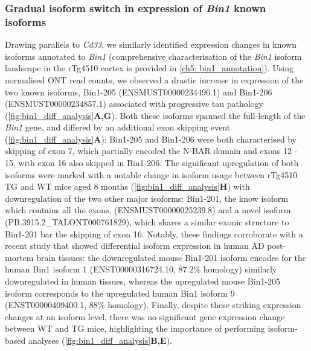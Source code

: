 \subsubsection{Gradual isoform switch in expression of \textit{Bin1} known isoforms}
Drawing parallels to \textit{Cd33}, we similarly identified expression changes in known isoforms annotated to \textit{Bin1} (comprehensive characterisation of the \textit{Bin1} isoform landscape in the rTg4510 cortex is provided in \cref{ch5: bin1_annotation}). Using normalised ONT read counts, we observed a drastic increase in expression of the two known isoforms, Bin1-205 (ENSMUST00000234496.1) and Bin1-206 (ENSMUST00000234857.1) associated with progressive tau pathology (\cref{fig:bin1_diff_analysis}\textbf{A,G}). Both these isoforms spanned the full-length of the \textit{Bin1} gene, and differed by an additional exon skipping event (\cref{fig:bin1_diff_analysis}\textbf{A}): Bin1-205 and Bin1-206 were both characterised by skipping of exon 7, which partially encoded the N-BAR domain and exons 12 - 15, with exon 16 also skipped in Bin1-206. The significant upregulation of both isoforms were marked with a notable change in isoform usage between rTg4510 TG and WT mice aged 8 months (\cref{fig:bin1_diff_analysis}\textbf{H}) with downregulation of the two other major isoforms: Bin1-201, the know isoform which contains all the exons, (ENSMUST00000025239.8) and a novel isoform (PB.3915.2\_TALONT000761829), which shares a similar exonic structure to Bin1-201 bar the skipping of exon 16. Notably, these findings corroborate with a recent study that showed differential isoform expression in human AD post-mortem brain tissues\cite{Taga2020}: the downregulated mouse Bin1-201 isoform encodes for the human Bin1 isoform 1 (ENST00000316724.10, 87.2\% homology) similarly downregulated in human tissues, whereas the upregulated mouse Bin1-205 isoform corresponds to the upregulated human Bin1 isoform 9 (ENST00000409400.1, 88\% homology). Finally, despite these striking expression changes at an isoform level, there was no significant gene expression change between WT and TG mice, highlighting the importance of performing isoform-based analyses (\cref{fig:bin1_diff_analysis}\textbf{B,E}). 

